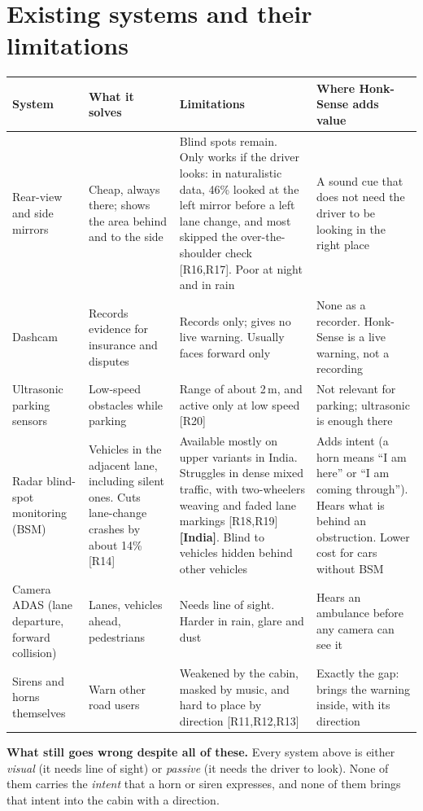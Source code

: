 \documentclass[11pt]{article}
\newcommand{\IN}{{\color{sky}\bfseries[India]}}
\renewcommand{\cite}[1]{{\color{navy}[#1]}}
\begin{document}
\section{Existing systems and their limitations}
\renewcommand{\arraystretch}{1.25}
{\small
\begin{tabularx}{\textwidth}{@{}p{2.6cm}XXX@{}}
\toprule
\textbf{System} & \textbf{What it solves} & \textbf{Limitations} & \textbf{Where Honk-Sense adds value} \\
\midrule
Rear-view and side mirrors & Cheap, always there; shows the area behind and to the side & Blind spots remain. Only works if the driver looks: in naturalistic data, 46\% looked at the left mirror before a left lane change, and most skipped the over-the-shoulder check \cite{R16,R17}. Poor at night and in rain & A sound cue that does not need the driver to be looking in the right place \\
Dashcam & Records evidence for insurance and disputes & Records only; gives no live warning. Usually faces forward only & None as a recorder. Honk-Sense is a live warning, not a recording \\
Ultrasonic parking sensors & Low-speed obstacles while parking & Range of about 2\,m, and active only at low speed \cite{R20} & Not relevant for parking; ultrasonic is enough there \\
Radar blind-spot monitoring (BSM) & Vehicles in the adjacent lane, including silent ones. Cuts lane-change crashes by about 14\% \cite{R14} & Available mostly on upper variants in India. Struggles in dense mixed traffic, with two-wheelers weaving and faded lane markings \cite{R18,R19}\,\IN. Blind to vehicles hidden behind other vehicles & Adds intent (a horn means ``I am here'' or ``I am coming through''). Hears what is behind an obstruction. Lower cost for cars without BSM \\
Camera ADAS (lane departure, forward collision) & Lanes, vehicles ahead, pedestrians & Needs line of sight. Harder in rain, glare and dust & Hears an ambulance before any camera can see it \\
Sirens and horns themselves & Warn other road users & Weakened by the cabin, masked by music, and hard to place by direction \cite{R11,R12,R13} & Exactly the gap: brings the warning inside, with its direction \\
\bottomrule
\end{tabularx}}

\textbf{What still goes wrong despite all of these.}
Every system above is either \emph{visual} (it needs line of sight) or \emph{passive} (it needs the driver to look). None of them carries the \emph{intent} that a horn or siren expresses, and none of them brings that intent into the cabin with a direction.
\end{document}
